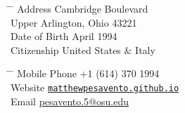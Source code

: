 \parbox{0.5\textwidth}{ %
\begin{tabbing} %
\hspace{3cm} \= \hspace{4cm} \= \kill %
{Address}  Cambridge Boulevard \\ %
\> Upper Arlington, Ohio 43221 \\ %
{Date of Birth}  April 1994 \\ %
{Citizenship} \> United States \& Italy %
\end{tabbing}}
\hfill %
\parbox{0.5\textwidth}{ %
\begin{tabbing} %
\hspace{3cm} \= \hspace{4cm} \= \kill %
{Mobile Phone} \> +1 (614) 370 1994 \\ %
{Website} \> \href{matthewpesavento.github.io}{\texttt{\small{matthewpesavento.github.io}}} \\
{Email} \> \href{mailto:pesavento.5@osu.edu}{pesavento.5@osu.edu} \\ %
\end{tabbing}}